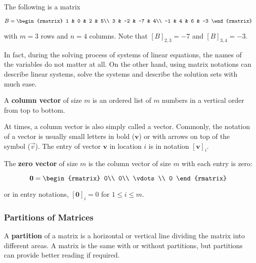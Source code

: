 \documentclass[a4paper,12pt]{article}
\begin{document}
\begin{exm}
  The following is a matrix

  $$B=\begin{rmatrix}
  1 & 0 & 2 & 5\\
  3 & -2 & -7 & 4\\
  -1 & 4 & 6 & -3
  \end{rmatrix}$$\s

  with $m=3$ rows and $n=4$ columns. Note that $[B]_{2,3}=-7$ and $[B]_{3,4}=-3$.
\end{exm}\n

In fact, during the solving process of systems of linear equations, the names of the variables do not matter at all. On the other hand, using matrix notations can describe linear systems, solve the systems and describe the solution sets with much ease.\n

\begin{dft}
  A \textbf{column vector} of size $m$ is an ordered list of $m$ numbers in a vertical order from top to bottom.
\end{dft}\n

At times, a column vector is also simply called a vector. Commonly, the notation of a vector is usually small letters in bold ($\mathbf{v}$) or with arrows on top of the symbol ($\vec{v}$). The entry of vector $\mathbf{v}$ in location $i$ is in notation $[\mathbf{v}]_{i}$.\n

\begin{dft}
  The \textbf{zero vector} of size $m$ is the column vector of size $m$ with each entry is zero:

  $$\mathbf{0}=\begin{rmatrix}
  0\\
  0\\
  \vdots\\
  0
  \end{rmatrix}$$\s

  or in entry notations, $[\mathbf{0}]_{i}=0$ for $1\leq i\leq m$.
\end{dft}

\propdisp

\subsubsection{Partitions of Matrices}
\begin{dft}
  A \textbf{partition} of a matrix is a horizontal or vertical line dividing the matrix into different areas. A matrix is the same with or without partitions, but partitions can provide better reading if required.
\end{dft}\n
\end{document}
